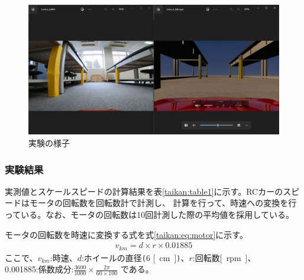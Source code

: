 \begin{figure}[h]
  \begin{center}
  \includegraphics[width=\linewidth]{img/10.png}
  \caption{実験の様子}
  \label{taikan:hikaku}
  \end{center}
\end{figure}

\clearpage
\subsubsection{実験結果}
実測値とスケールスピードの計算結果を表\ref{taikan:table1}に示す。RCカーのスピードはモータの回転数を回転数計で計測し、
計算を行って、時速への変換を行っている。なお、モータの回転数は10回計測した際の平均値を採用している。
 
\begin{table}[ht]
\centering
\caption{実速度とスケールスピードの計算結果}
\end{table}%

モータの回転数を時速に変換する式を式\eqref{taikan:eq:motor}に示す。
\begin{align}
  v_{km} = d \times r \times 0.01885 \label{taikan:eq:motor}
\end{align}
ここで、$v_{km}$:時速、$d$:ホイールの直径\verb|(|6 \si{[cm]}\verb|)|、$r$:回転数\si{[rpm]}、\\0.001885:係数成分:$\frac{3600}{1000}\times\frac{2\pi}{60\times100}$
である。

